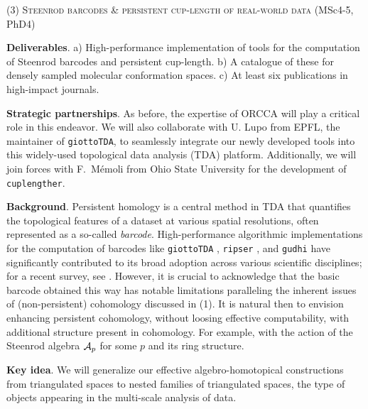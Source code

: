 
\smallskip
{\centering (3) \textsc{Steenrod barcodes \& persistent cup-length of real-world data} (MSc4-5, PhD4)\par}

\medskip\noindent\textbf{Deliverables}.
a) High-performance implementation of tools for the computation of Steenrod barcodes and persistent cup-length.
b) A catalogue of these for densely sampled molecular conformation spaces.
c) At least six publications in high-impact journals.

\smallskip\textbf{Strategic partnerships}.
As before, the expertise of ORCCA will play a critical role in this endeavor. We will also collaborate with U. Lupo from EPFL, the maintainer of \texttt{giottoTDA}, to seamlessly integrate our newly developed tools into this widely-used topological data analysis (TDA) platform.
Additionally, we will join forces with F.~Mémoli from Ohio State University for the development of \texttt{cuplengther}.

\smallskip\noindent\textbf{Background}.
Persistent homology is a central method in TDA that quantifies the topological features of a dataset at various spatial resolutions, often represented as a so-called \textit{barcode}.
High-performance algorithmic implementations for the computation of barcodes like \texttt{giottoTDA} \cite{medina2021giotto}, \texttt{ripser} \cite{bauer2021ripser}, and \texttt{gudhi} \cite{maria2014gudhi} have significantly contributed to its broad adoption across various scientific disciplines; for a recent survey, see \cite{carlsson2021topological}.
However, it is crucial to acknowledge that the basic barcode obtained this way has notable limitations paralleling the inherent issues of (non-persistent) cohomology discussed in (1).
It is natural then to envision enhancing persistent cohomology, without loosing effective computability, with additional structure present in cohomology.
For example, with the action of the Steenrod algebra $\mathcal{A}_p$ for some $p$ and its ring structure.

\medskip\noindent\textbf{Key idea}.
We will generalize our effective algebro-homotopical constructions from triangulated spaces to nested families of triangulated spaces, the type of objects appearing in the multi-scale analysis of data.

